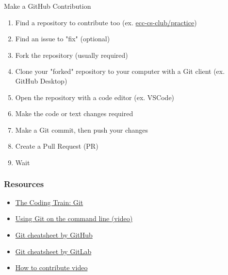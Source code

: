 \documentclass{beamer}
\begin{document}
\begin{frame}{Make a GitHub Contribution}
	\begin{enumerate}
		\item Find a repository to contribute too (ex. \href{https://github.com/ecc-cs-club/practice}{ecc-cs-club/practice})
		\item Find an issue to "fix" (optional)
		\item Fork the repository (usually required)
		\item Clone your "forked" repository to your computer with a Git client (ex. GitHub Desktop)
		\item Open the repository with a code editor (ex. VSCode)
		\item Make the code or text changes required
		\item Make a Git commit, then push your changes
		\item Create a Pull Request (PR)
		\item Wait
	\end{enumerate}
\end{frame}

\begin{frame}
	\frametitle{Resources}

	\begin{itemize}
		\item \href{https://www.youtube.com/watch?v=BCQHnlnPusY&list=PLRqwX-V7Uu6ZF9C0YMKuns9sLDzK6zoiV}{The Coding Train: Git}
		\item \href{https://www.youtube.com/watch?v=USjZcfj8yxE}{Using Git on the command line (video)}
		\item \href{https://education.github.com/git-cheat-sheet-education.pdf}{Git cheatsheet by GitHub}
		\item \href{https://about.gitlab.com/images/press/git-cheat-sheet.pdf}{Git cheatsheet by GitLab}
		\item \href{https://www.youtube.com/watch?v=yr6IzOGoMsQ}{How to contribute video}
	\end{itemize}
\end{frame}
\end{document}
